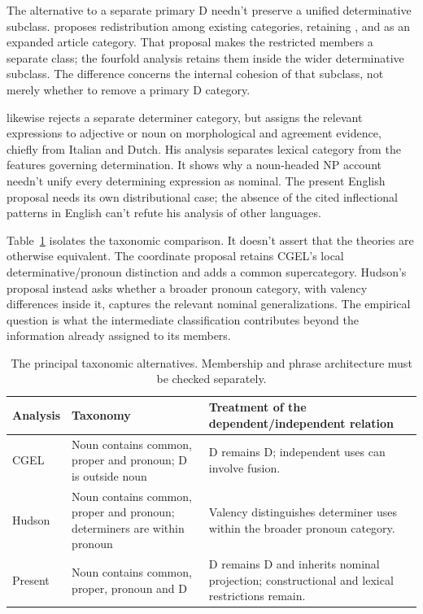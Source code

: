 \documentclass[12pt]{article}
\begin{document}
The alternative to a separate primary D needn't preserve a unified determinative subclass. \textcite{spinillo2004reconceptualising} proposes redistribution among existing categories, retaining ,  and  as an expanded article category. That proposal makes the restricted members a separate class; the fourfold analysis retains them inside the wider determinative subclass. The difference concerns the internal cohesion of that subclass, not merely whether to remove a primary D category.

\textcite{vaneynde2003determiner} likewise rejects a separate determiner category, but assigns the relevant expressions to adjective or noun on morphological and agreement evidence, chiefly from Italian and Dutch. His analysis separates lexical category from the features governing determination. It shows why a noun-headed NP account needn't unify every determining expression as nominal. The present English proposal needs its own distributional case; the absence of the cited inflectional patterns in English can't refute his analysis of other languages.

Table~\ref{tab:rivals} isolates the taxonomic comparison. It doesn't assert that the theories are otherwise equivalent. The coordinate proposal retains CGEL's local determinative/pronoun distinction and adds a common supercategory. Hudson's proposal instead asks whether a broader pronoun category, with valency differences inside it, captures the relevant nominal generalizations. The empirical question is what the intermediate classification contributes beyond the information already assigned to its members.

\begin{table}[tb]
\centering\small
\caption{The principal taxonomic alternatives. Membership and phrase architecture must be checked separately.}\label{tab:rivals}
\begin{tabular}{>{\raggedright\arraybackslash}p{2.1cm}>{\raggedright\arraybackslash}p{4.5cm}>{\raggedright\arraybackslash}p{5.1cm}}
\toprule
Analysis & Taxonomy & Treatment of the dependent/independent relation \\
\midrule
CGEL & Noun contains common, proper and pronoun; D is outside noun & D remains D; independent uses can involve fusion. \\
Hudson & Noun contains common, proper and pronoun; determiners are within pronoun & Valency distinguishes determiner uses within the broader pronoun category. \\
Present & Noun contains common, proper, pronoun and D & D remains D and inherits nominal projection; constructional and lexical restrictions remain. \\
\bottomrule
\end{tabular}
\end{table}
\end{document}
